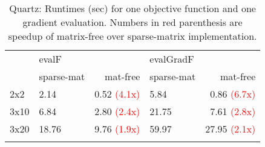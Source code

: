 \documentclass[letterpaper]{article}
\begin{document}
\begin{table}[h]
  \begin{tabular}{l|lr|lr}
    \hline\noalign{\smallskip}
         & evalF &    &  evalGradF & \\
         & sparse-mat & mat-free & sparse-mat& mat-free  \\
    \noalign{\smallskip}\hline\noalign{\smallskip}
    2x2  &  2.14 & 0.52  \textcolor{red}{ (4.1x)} &  5.84 & 0.86 \textcolor{red}{ (6.7x)}  \\
    3x10 &  6.84 & 2.80  \textcolor{red}{ (2.4x)} & 21.75 & 7.61 \textcolor{red}{(2.8x)}   \\
    3x20 & 18.76 & 9.76  \textcolor{red}{(1.9x)}  & 59.97 & 27.95 \textcolor{red}{(2.1x)}  \\
    \noalign{\smallskip}\hline
  \end{tabular}
  \caption{Quartz: Runtimes (sec) for one objective function and one gradient evaluation. Numbers in red parenthesis are speedup of matrix-free over sparse-matrix implementation.}
  \label{tab:runtime_quartz} 
\end{table}
\end{document}
